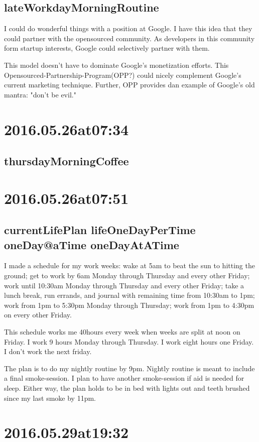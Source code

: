 \begin{enumerate}
\subsection*{lateWorkdayMorningRoutine}
I could do wonderful things with a position at Google. I have this idea that they could partner with the opensourced community. As developers in this community form startup interests, Google could selectively partner with them.

This model doesn't have to dominate Google's monetization efforts. This Opensourced-Partnership-Program(OPP?) could nicely complement Google's current marketing technique. Further, OPP provides dan example of Google's old mantra: "don't be evil."

\section*{ 2016.05.26at07:34 }
\subsection*{thursdayMorningCoffee}


\section*{ 2016.05.26at07:51 }
\subsection*{currentLifePlan lifeOneDayPerTime oneDay@aTime oneDayAtATime}
I made a schedule for my work weeks: wake at 5am to beat the sun to hitting the ground; get to work by 6am Monday through Thursday and every other Friday; work until 10:30am Monday through Thursday and every other Friday; take a lunch break, run errands, and journal with remaining time from 10:30am to 1pm; work from 1pm to 5:30pm Monday through Thursday; work from 1pm to 4:30pm on every other Friday.

This schedule works me 40hours every week when weeks are split at noon on Friday. I work 9 hours Monday through Thursday. I work eight hours one Friday. I don't work the next friday.

The plan is to do my nightly routine by 9pm. Nightly routine is meant to include a final smoke-session. I plan to have another smoke-session if aid is needed for sleep. Either way, the plan holds to be in bed with lights out and teeth brushed since my last smoke by 11pm.

\section*{ 2016.05.29at19:32 }

\end{enumerate}
